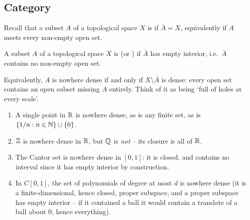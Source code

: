 \documentclass[a4paper]{scrartcl}
\begin{document}
\subsection{Category}

Recall that a subset $A$ of a topological space $X$ is  if $\bar A = X$, equivalently if $A$ meets every non-empty open set.

\begin{definition}
	A subset $A$ of a topological space $X$ is  (or ) if $\bar A$ has empty interior, i.e.\ $\bar A$ contains no non-empty open set.
\end{definition}

Equivalently, $A$ is nowhere dense if and only if $X \setminus \bar A$ is dense: every open set contains an open subset missing $A$ entirely. Think of it as being `full of holes at every scale'.

\begin{example}
	\begin{enumerate}[label=(\roman*)]
		\item A single point in $\mathbb{R}$ is nowhere dense, as is any finite set, as is $\{1/n : n \in \mathbb{N}\} \cup \{0\}$.
		\item $\mathbb{Z}$ is nowhere dense in $\mathbb{R}$, but $\mathbb{Q}$ is \emph{not} -- its closure is all of $\mathbb{R}$.
		\item The Cantor set is nowhere dense in $[0,1]$: it is closed, and contains no interval since it has empty interior by construction.
		\item In $C[0,1]$, the set of polynomials of degree at most $d$ is nowhere dense (it is a finite-dimensional, hence closed, proper subspace, and a proper subspace has empty interior -- if it contained a ball it would contain a translate of a ball about $0$, hence everything).
	\end{enumerate}
\end{example}

\begin{center}
\end{center}
\end{document}
